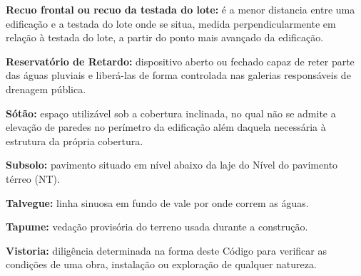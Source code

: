 \vspace{10pt}\noindent\textbf{Recuo frontal ou recuo da testada do lote:} é a menor distancia entre uma edificação e a testada do lote onde se situa, medida perpendicularmente em relação à testada do lote, a partir do ponto mais avançado da edificação.

\vspace{10pt}\noindent\textbf{Reservatório de Retardo:} dispositivo aberto ou fechado capaz de reter parte das águas pluviais e liberá-las de forma controlada nas galerias responsáveis de drenagem pública.

\vspace{10pt}\noindent\textbf{Sótão:} espaço utilizável sob a cobertura inclinada, no qual não se admite a elevação de paredes no perímetro da edificação além daquela necessária à estrutura da própria cobertura.

\vspace{10pt}\noindent\textbf{Subsolo:} pavimento situado em nível abaixo da laje do Nível do pavimento térreo (NT).

\vspace{10pt}\noindent\textbf{Talvegue:} linha sinuosa em fundo de vale por onde correm as águas.

\vspace{10pt}\noindent\textbf{Tapume:} vedação provisória do terreno usada durante a construção.

\vspace{10pt}\noindent\textbf{Vistoria:} diligência determinada na forma deste Código para verificar as condições de uma obra, instalação ou exploração de qualquer natureza.